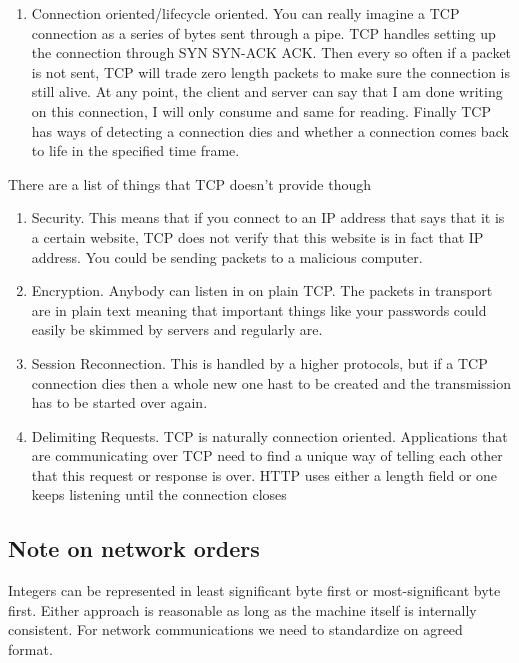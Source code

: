 \begin{aside}
\begin{enumerate}
  \item Connection oriented/lifecycle oriented. You can really imagine a TCP connection as a series of bytes sent through a pipe. TCP handles setting up the connection through SYN SYN-ACK ACK. Then every so often if a packet is not sent, TCP will trade zero length packets to make sure the connection is still alive. At any point, the client and server can say that I am done writing on this connection, I will only consume and same for reading. Finally TCP has ways of detecting a connection dies and whether a connection comes back to life in the specified time frame.

\end{enumerate}

There are a list of things that TCP doesn't provide though

\begin{enumerate}
  \item Security. This means that if you connect to an IP address that says that it is a certain website, TCP does not verify that this website is in fact that IP address. You could be sending packets to a malicious computer.
  \item Encryption. Anybody can listen in on plain TCP. The packets in transport are in plain text meaning that important things like your passwords could easily be skimmed by servers and regularly are.
  \item Session Reconnection. This is handled by a higher protocols, but if a TCP connection dies then a whole new one hast to be created and the transmission has to be started over again.
  \item Delimiting Requests. TCP is naturally connection oriented. Applications that are communicating over TCP need to find a unique way of telling each other that this request or response is over. HTTP uses either a length field or one keeps listening until the connection closes
\end{enumerate}

\end{aside}

\subsection{Note on network orders}

Integers can be represented in least significant byte first or most-significant byte first. Either approach is reasonable as long as the machine itself is internally consistent. For network communications we need to standardize on agreed format.

